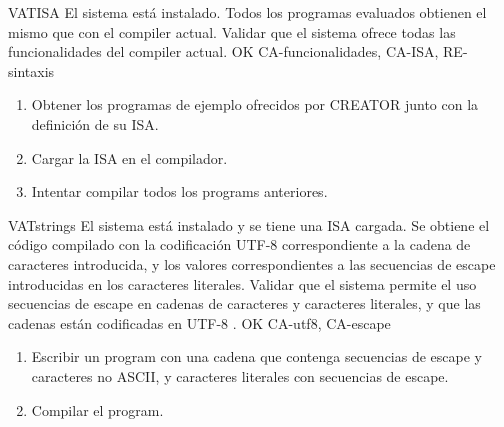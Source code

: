 \begin{testCase}{VAT}{ISA}
    {El sistema está instalado.} %
    {Todos los programas evaluados obtienen el mismo que con el \gls{compiler} actual.} %
    {Validar que el sistema ofrece todas las funcionalidades del \gls{compiler} actual.} %
    {OK} %
    {CA-funcionalidades, CA-ISA, RE-sintaxis} %
    \begin{enumerate}[leftmargin=*, topsep=0pt, noitemsep] %
        \item Obtener los programas de ejemplo ofrecidos por CREATOR junto con
        la definición de su \gls{ISA}.
        \item Cargar la \gls{ISA} en el compilador.
        \item Intentar compilar todos los \glspl{program} anteriores.
    \end{enumerate}
\end{testCase}

\begin{testCase}{VAT}{strings}
    {El sistema está instalado y se tiene una \gls{ISA} cargada.} %
    {Se obtiene el código compilado con la codificación UTF-8 \parencite{UTF-8}
    correspondiente a la cadena de caracteres introducida, y los valores
    correspondientes a las secuencias de escape introducidas en los caracteres
    literales.} %
    {Validar que el sistema permite el uso secuencias de escape en cadenas de
    caracteres y caracteres literales, y que las cadenas están codificadas en
    UTF-8 \parencite{UTF-8}.} %
    {OK} %
    {CA-utf8, CA-escape} %
    \begin{enumerate}[leftmargin=*, topsep=0pt, noitemsep] %
        \item Escribir un \gls{program} con una cadena que contenga
        secuencias de escape y caracteres no ASCII, y caracteres
        literales con secuencias de escape.
        \item Compilar el \gls{program}.
    \end{enumerate}
\end{testCase}


